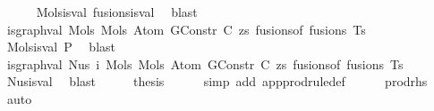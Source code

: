 \begin{isabellebody}
\ \ \ \ \isamarkupfalse%
\ Mols{}{\isacharunderscore}{\kern0pt}is{\isacharunderscore}{\kern0pt}val\ fusions{\isacharunderscore}{\kern0pt}is{\isacharunderscore}{\kern0pt}val\ \isamarkupfalse%
\ blast\isanewline
\isanewline
\ \ \isamarkupfalse%
\ \isamarkupfalse%
\ {\isachardoublequoteopen}is{\isacharunderscore}{\kern0pt}graph{\isacharunderscore}{\kern0pt}val\ {\isacharparenleft}{\kern0pt}Mols{}\ {\isacharparenleft}{\kern0pt}Mols{}\ {\isacharparenleft}{\kern0pt}Atom\ {\isacharparenleft}{\kern0pt}GConstr\ C{\isacharparenright}{\kern0pt}\ zs{\isacharparenright}{\kern0pt}\ {\isacharparenleft}{\kern0pt}fusions{\isacharunderscore}{\kern0pt}of\ fusions{\isacharparenright}{\kern0pt}{\isacharparenright}{\kern0pt}\ Ts{\isacharparenright}{\kern0pt}{\isachardoublequoteclose}\isanewline
\ \ \ \ \isamarkupfalse%
\ Mols{}{\isacharunderscore}{\kern0pt}is{\isacharunderscore}{\kern0pt}val\ P{}\ \isamarkupfalse%
\ blast\isanewline
\isanewline
\ \ \isamarkupfalse%
\ \isamarkupfalse%
\ {\isachardoublequoteopen}is{\isacharunderscore}{\kern0pt}graph{\isacharunderscore}{\kern0pt}val\ {\isacharparenleft}{\kern0pt}Nus{}\ i\ {\isacharparenleft}{\kern0pt}Mols{}\ {\isacharparenleft}{\kern0pt}Mols{}\ {\isacharparenleft}{\kern0pt}Atom\ {\isacharparenleft}{\kern0pt}GConstr\ C{\isacharparenright}{\kern0pt}\ zs{\isacharparenright}{\kern0pt}\ {\isacharparenleft}{\kern0pt}fusions{\isacharunderscore}{\kern0pt}of\ fusions{\isacharparenright}{\kern0pt}{\isacharparenright}{\kern0pt}\ Ts{\isacharparenright}{\kern0pt}{\isacharparenright}{\kern0pt}{\isachardoublequoteclose}\isanewline
\ \ \ \ \isamarkupfalse%
\ Nus{\isacharunderscore}{\kern0pt}is{\isacharunderscore}{\kern0pt}val\ \isamarkupfalse%
\ blast\isanewline
\isanewline
\ \ \isamarkupfalse%
\ \isamarkupfalse%
\ {\isacharquery}{\kern0pt}thesis\isanewline
\ \ \ \ \isamarkupfalse%
\ {\isacharparenleft}{\kern0pt}simp\ add{\isacharcolon}{\kern0pt}\ app{\isacharunderscore}{\kern0pt}prodrule{\isacharunderscore}{\kern0pt}def{\isacharparenright}{\kern0pt}\isanewline
\ \ \ \ \isamarkupfalse%
\ prod{\isacharunderscore}{\kern0pt}rhs\ \isamarkupfalse%
\ auto\isanewline
{}\isamarkupfalse%
%
\endisatagproof
{\isafoldproof}%
%
\isadelimproof
%
\endisadelimproof

\end{isabellebody}
